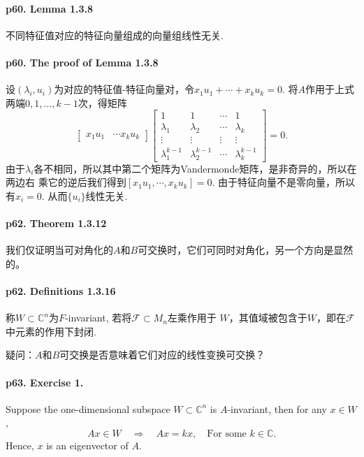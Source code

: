   \paragraph{p60. Lemma 1.3.8} 
    不同特征值对应的特征向量组成的向量组线性无关. 
  \paragraph{p60. The proof of Lemma 1.3.8}
    设$(\lambda_i, u_i)$为对应的特征值-特征向量对，令$x_1u_1+\cdots+x_ku_k=0$.
    将$A$作用于上式两端$0,1,\dots,k-1$次，得矩阵
    \[
      \begin{bmatrix}
        x_1u_1 & \cdots x_ku_k
      \end{bmatrix}
      \begin{bmatrix}
        1          & 1 & \cdots & 1 \\
        \lambda_1  & \lambda_2 & \cdots & \lambda_k \\
        \vdots & \vdots & \vdots & \vdots \\
        \lambda_1^{k-1} & \lambda_2^{k-1} & \cdots & \lambda_k^{k-1}
      \end{bmatrix}
      =0.
    \]
    由于$\lambda_i$各不相同，所以其中第二个矩阵为Vandermonde矩阵，是非奇异的，所以在两边右
    乘它的逆后我们得到$[x_1u_1, \cdots, x_ku_k] = 0$. 由于特征向量不是零向量，所以有$x_i
    =0$. 从而$\{u_i\}$线性无关. 

  \paragraph{p62. Theorem 1.3.12}
    我们仅证明当可对角化的$A$和$B$可交换时，它们可同时对角化，另一个方向是显然的。

  \paragraph{p62. Definitions 1.3.16}
    称$W\subset\mathbb{C}^n$为$F$-invariant, 若将$\mathcal{F}\subset M_n$左乘作用于
    $W$，其值域被包含于$W$，即在$\mathcal{F}$中元素的作用下封闭. \par
    疑问：$A$和$B$可交换是否意味着它们对应的线性变换可交换？

  \paragraph{p63. Exercise 1.}
    Suppose the one-dimensional subspace $W \subset \mathbb{C}^n$ is 
    $A$-invariant, then for any $x\in W$, 
    \[
      Ax\in W \quad\Rightarrow\quad Ax=kx,\quad\text{For some $k\in\mathbb{C}$.}
    \]
    Hence, $x$ is an eigenvector of $A$.


